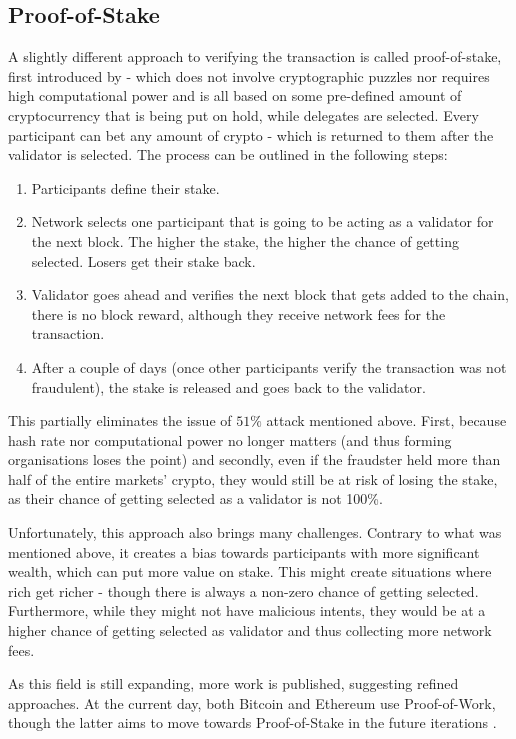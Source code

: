 \subsection{Proof-of-Stake}
A slightly different approach to verifying the transaction is called proof-of-stake, first introduced by \cite{king2012ppcoin} - which does not involve cryptographic puzzles nor requires high computational power and is all based on some pre-defined amount of cryptocurrency that is being put on hold, while delegates are selected. Every participant can bet any amount of crypto - which is returned to them after the validator is selected. The process can be outlined in the following steps:
\begin{enumerate}
    \item Participants define their stake.
    \item Network selects one participant that is going to be acting as a validator for the next block. The higher the stake, the higher the chance of getting selected. Losers get their stake back.
    \item Validator goes ahead and verifies the next block that gets added to the chain, there is no block reward, although they receive network fees for the transaction.
    \item After a couple of days (once other participants verify the transaction was not fraudulent), the stake is released and goes back to the validator.
\end{enumerate}
This partially eliminates the issue of $51\%$ attack mentioned above. First, because hash rate nor computational power no longer matters (and thus forming organisations loses the point) and secondly, even if the fraudster held more than half of the entire markets' crypto, they would still be at risk of losing the stake, as their chance of getting selected as a validator is not 100\%.

Unfortunately, this approach also brings many challenges. Contrary to what was mentioned above, it creates a bias towards participants with more significant wealth, which can put more value on stake. This might create situations where rich get richer - though there is always a non-zero chance of getting selected. Furthermore, while they might not have malicious intents, they would be at a higher chance of getting selected as validator and thus collecting more network fees.

As this field is still expanding, more work is published, suggesting refined approaches. At the current day, both Bitcoin and Ethereum use Proof-of-Work, though the latter aims to move towards Proof-of-Stake in the future iterations \cite{saleh2020blockchain}.
